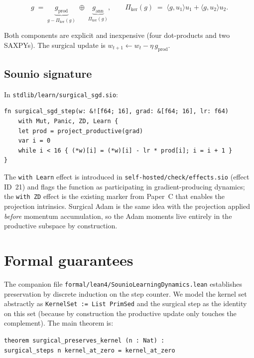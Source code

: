 \documentclass{article}
\begin{document}
\begin{equation*}
g \;=\; \underbrace{g_\text{prod}}_{g - \Pi_\text{ker}(g)} \;\oplus\;
       \underbrace{g_\text{ann}}_{\Pi_\text{ker}(g)},
\qquad \Pi_\text{ker}(g) \;=\; \langle g, u_1 \rangle u_1 + \langle g, u_2 \rangle u_2.
\end{equation*}

Both components are explicit and inexpensive (four dot-products and
two SAXPYs).  The surgical update is
$w_{t+1} \leftarrow w_t - \eta \, g_\text{prod}$.

\subsection{Sounio signature}

In \texttt{stdlib/learn/surgical\_sgd.sio}:

\begin{lstlisting}
fn surgical_sgd_step(w: &![f64; 16], grad: &[f64; 16], lr: f64)
    with Mut, Panic, ZD, Learn {
    let prod = project_productive(grad)
    var i = 0
    while i < 16 { (*w)[i] = (*w)[i] - lr * prod[i]; i = i + 1 }
}
\end{lstlisting}

The \texttt{with Learn} effect is introduced in
\texttt{self-hosted/check/effects.sio} (effect ID~21) and flags the
function as participating in gradient-producing dynamics; the
\texttt{with ZD} effect is the existing marker from Paper~C that
enables the projection intrinsics.  Surgical Adam is the same idea
with the projection applied \emph{before} momentum accumulation, so
the Adam moments live entirely in the productive subspace by
construction.

\section{Formal guarantees}
\label{sec:lean}

The companion file \texttt{formal/lean4/SounioLearningDynamics.lean}
establishes preservation by discrete induction on the step counter.
We model the kernel set abstractly as \texttt{KernelSet := List PrimSed}
and the surgical step as the identity on this set (because by
construction the productive update only touches the complement).
The main theorem is:

\medskip
\noindent
\texttt{theorem surgical\_preserves\_kernel (n : Nat) :\\
\hspace*{1em}surgical\_steps n kernel\_at\_zero = kernel\_at\_zero}
\end{document}
